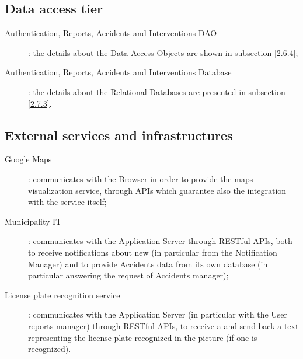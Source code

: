 \documentclass[../../DD.tex]{subfiles}
\begin{document}
\subsection{Data access tier\label{sect:2.2.4}}
	\begin{description}
	\item[Authentication, Reports, Accidents and Interventions DAO]: the details about the Data Access Objects are shown in subsection \ref{2.6.4};
	\item[Authentication, Reports, Accidents and Interventions Database]: the details about the Relational Databases are presented in subsection \ref{2.7.3}.
	\end{description}
	
\subsection{External services and infrastructures\label{sect:2.2.5}}
	\begin{description}
	\item[Google Maps]: communicates with the Browser in order to provide the maps visualization service, through APIs which guarantee also the integration with the service itself;
	
	\item[Municipality IT]: communicates with the Application Server through RESTful APIs, both to receive notifications about new  (in particular from the Notification Manager) and to provide Accidents data from its own database (in particular answering the request of Accidents manager);
	
	\item[License plate recognition service]: communicates with the Application Server (in particular with the User reports manager) through RESTful APIs, to receive a  and send back a text representing the license plate recognized in the picture (if one is recognized). 
	\end{description}

\newpage
\end{document}
